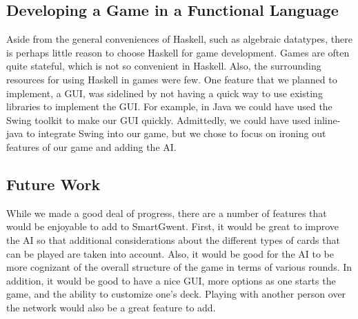 \documentclass[numbers]{sigplanconf}
\begin{document}
\subsection{Developing a Game in a Functional Language}
Aside from the general conveniences of Haskell, such as algebraic datatypes, there is perhaps little reason to choose Haskell for game development. Games are often quite stateful, which is not so convenient in Haskell. Also, the surrounding resources for using Haskell in games were few. One feature that we planned to implement, a GUI, was sidelined by not having a quick way to use existing libraries to implement the GUI. For example, in Java we could have used the Swing toolkit to make our GUI quickly. Admittedly, we could have used inline-java to integrate Swing into our game, but we chose to focus on ironing out features of our game and adding the AI.

\subsection{Future Work}
While we made a good deal of progress, there are a number of features that would be enjoyable to add to SmartGwent. First, it would be great to improve the AI so that additional considerations about the different types of cards that can be played are taken into account. Also, it would be good for the AI to be more cognizant of the overall structure of the game in terms of various rounds. In addition, it would be good to have a nice GUI, more options as one starts the game, and the ability to customize one's deck. Playing with another person over the network would also be a great feature to add.




\end{document}
